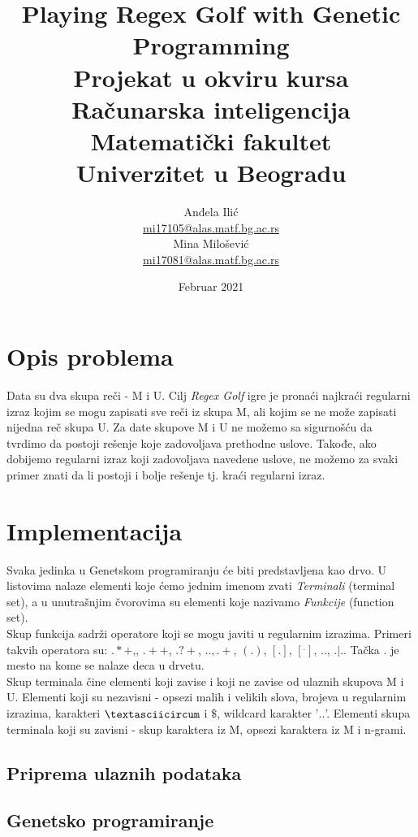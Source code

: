 \documentclass{article}
\title{%
  Playing Regex Golf with Genetic Programming \vspace{0.4cm} \\ 
  \large Projekat u okviru kursa Računarska inteligencija \\
  Matematički fakultet\\ Univerzitet u Beogradu \vspace*{0.5cm}}
\author{Anđela Ilić \\
\href{mailto:mi17105@alas.matf.bg.ac.rs}{mi17105@alas.matf.bg.ac.rs} \\
Mina Milošević \\
\href{mailto:mi17081@alas.matf.bg.ac.rs}{mi17081@alas.matf.bg.ac.rs} \\
}
\date{\vspace*{1cm}Februar 2021}
\begin{document}
\maketitle

\newpage

\renewcommand*\contentsname{Sadržaj}
\tableofcontents
\newpage

\section{Opis problema}
Data su dva skupa reči - M i U. Cilj \textit{Regex Golf} igre je pronaći najkraći regularni izraz kojim se mogu zapisati sve reči iz skupa M, ali kojim se ne može zapisati nijedna reč skupa U. Za date skupove M i U ne možemo sa sigurnošću da tvrdimo da postoji rešenje koje zadovoljava prethodne uslove. Takođe, ako dobijemo regularni izraz koji zadovoljava navedene uslove, ne možemo za svaki primer znati da li postoji i bolje rešenje tj. kraći regularni izraz. 

\section{Implementacija}
Svaka jedinka u Genetskom programiranju će biti predstavljena kao drvo.
U listovima nalaze elementi koje ćemo jednim imenom zvati \textit{Terminali} (terminal set), a u unutrašnjim čvorovima su elementi koje nazivamo \textit{Funkcije} (function set). \\
Skup funkcija sadrži operatore koji se mogu javiti u regularnim izrazima. Primeri takvih operatora su: $.*+$,, $.++$, $.?+$, $.{.,.}+$, $(.)$, $[.]$,
$[^.]$, $..$, $.|.$. Tačka $.$ je mesto na kome se nalaze deca u drvetu. \\
Skup terminala čine elementi koji zavise i koji ne zavise od ulaznih skupova M i U. Elementi koji su nezavisni - opsezi malih i velikih slova, brojeva u
regularnim izrazima, karakteri $\textasciicircum$ i $\$$, wildcard karakter '$..$'. Elementi skupa terminala koji su zavisni - skup karaktera iz M, opsezi karaktera iz M i n-grami.

\subsection{Priprema ulaznih podataka}



\subsection{Genetsko programiranje}
\end{document}

